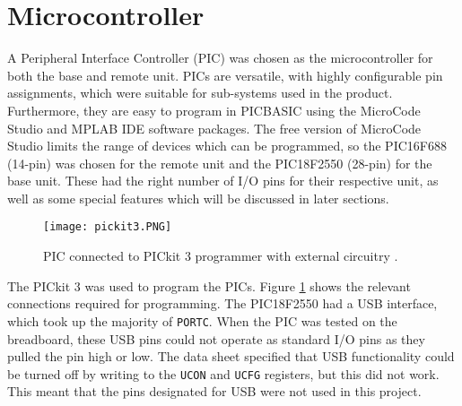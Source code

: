 \section{Microcontroller}
A Peripheral Interface Controller (PIC) was chosen as the microcontroller for both the base and remote unit. PICs are versatile, with highly configurable pin assignments, which were suitable for sub-systems used in the product. Furthermore, they are easy to program in PICBASIC using the MicroCode Studio \cite{microcode_studio} and MPLAB IDE software packages. The free version of MicroCode Studio limits the range of devices which can be programmed, so the PIC16F688 (14-pin) \cite{pic16f688} was chosen for the remote unit and the PIC18F2550 (28-pin) \cite{pic18f2550} for the base unit. These had the right number of I/O pins for their respective unit, as well as some special features which will be discussed in later sections.\\

\begin{figure}[htb]
	\centering
	\texttt{[image: pickit3.PNG]}
	\caption{PIC connected to PICkit 3 programmer with external circuitry \cite{pickit3}.}
	\label{fig: pickit3}
\end{figure}

The PICkit 3 \cite{pickit3} was used to program the PICs. Figure \ref{fig: pickit3} shows the relevant connections required for programming. The PIC18F2550 had a USB interface, which took up the majority of \verb|PORTC|. When the PIC was tested on the breadboard, these USB pins could not operate as standard I/O pins as they pulled the pin high or low. The data sheet specified that USB functionality could be turned off by writing to the \verb|UCON| and \verb|UCFG| registers, but this did not work. This meant that the pins designated for USB were not used in this project.\\
